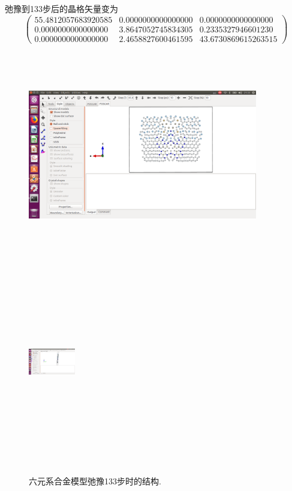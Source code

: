 \documentclass[10pt,a4paper]{article}
\begin{document}
\newpage
弛豫到133步后的晶格矢量变为
\begin{displaymath}
	\begin{pmatrix}
		55.4812057683920585   & 0.0000000000000000   & 0.0000000000000000 \\
     0.0000000000000000   & 3.8647052745834305  &  0.2335327946601230 \\
     0.0000000000000000   & 2.4658827600461595  & 43.6730869615263515
	\end{pmatrix}
\end{displaymath}
\begin{figure}[h!]
\centering
\includegraphics[height=3.55in,width=3.95in,viewport=580 120 1130 690,clip]{Ni3Al_mid-1.png}
\hspace{0.1in}
\includegraphics[height=3.55in,width=0.8in,viewport=800 120 920 690,clip]{Ni3Al_mid-2.png}
\caption{\small 六元系合金模型弛豫133步时的结构.}%
\label{Ni:Ni3Al_mid}
\end{figure}
\end{document}
